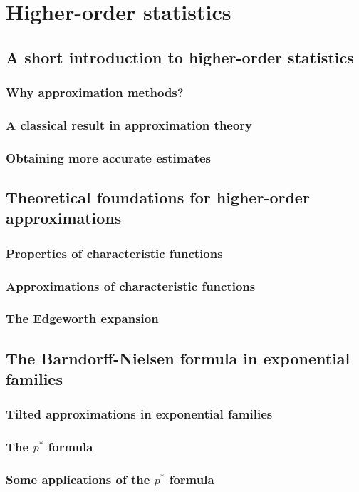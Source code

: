 
\part{Higher-order statistics}

\chapter{A short introduction to higher-order statistics}

\section{Why approximation methods?}

\section{A classical result in approximation theory}

\section{Obtaining more accurate estimates}

\chapter{Theoretical foundations for higher-order approximations}

\section{Properties of characteristic functions}

\section{Approximations of characteristic functions}

\section{The Edgeworth expansion}

\chapter{The Barndorff-Nielsen formula in exponential families}

\section{Tilted approximations in exponential families}

\section{The $p^*$ formula}

\section{Some applications of the $p^*$ formula}